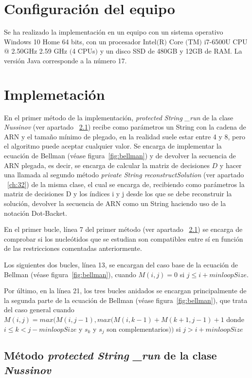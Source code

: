 \documentclass[11pt,letterpaper]{article}
\begin{document}
\section{Configuración del equipo}
Se ha realizado la implementación en un equipo con un sistema operativo Windows 10 Home 64 bits, con un procesador Intel$($R$)$ Core $($TM$)$ i7-6500U CPU $@$ 2.50GHz 2.59 GHz $($4 CPUs$)$ y un disco SSD de 480GB y 12GB de RAM. La versión Java corresponde a la número 17.

\section{Implemetación}

En el primer método de la implementación, \textit{protected String \_run} de la clase \textit{Nussinov} (ver apartado ~\ref{ch:31}) recibe como parámetros un String con la cadena de ARN y el tamaño mínimo de plegado, en la realidad suele estar entre 4 y 8, pero el algoritmo puede aceptar cualquier valor. Se encarga de implementar la ecuación de Bellman (véase figura~\ref{fig:bellman}) y de devolver la secuencia de ARN plegada, es decir, se encarga de calcular la matriz de decisiones $D$ y hacer una llamada al segundo método \textit{private String reconstructSolution} (ver apartado ~\ref{ch:32}) de la misma clase, el cual se encarga de, recibiendo como parámetros la matriz de decisiones D y los índices i y j desde los que se debe reconstruir la solución, devolver la secuencia de ARN como un String haciendo uso de la notación Dot-Backet.

En el primer bucle, línea 7 del primer método (ver apartado ~\ref{ch:31}) se encarga de comprobar si los nucleótidos que se estudian son compatibles entre sí en función de las restricciones comentadas anteriormente.

Los siguientes dos bucles, línea 13, se encargan del caso base de la ecuación de Bellman (véase figura~\ref{fig:bellman}), cuando $M(i,j) = 0$ si $j \leqslant i+minloopSize$.

Por último, en la línea 21, los tres bucles anidados se encargan principalmente de la segunda parte de la ecuación de Bellman (véase figura~\ref{fig:bellman}), que trata del caso general cuando $M(i,j) = max(M(i,j-1), max (M(i, k-1) + M(k+1,j-1) + 1$ donde $i \leqslant k < j-minloopSize$ y $s_{k}$ y $s_{j}$ son complementarios$))$ si $j > i+minloopSize$

\newpage
\subsection{Método \textit{protected String \_run} de la clase \textit{Nussinov}}\label{ch:31}
\end{document}
